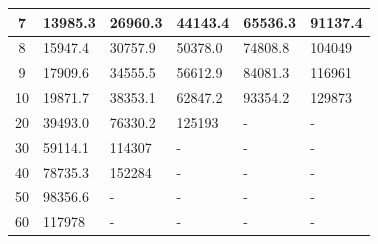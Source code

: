\begin{table}[H]
\begin{tabular}{|c|l|l|l|l|l|}
7                                                                          & 13985.3                              & 26960.3                               & 44143.4                               & 65536.3                               & 91137.4                               \\ \hline
8                                                                          & 15947.4                              & 30757.9                               & 50378.0                               & 74808.8                               & 104049                                \\ \hline
9                                                                          & 17909.6                              & 34555.5                               & 56612.9                               & 84081.3                               & 116961                                \\ \hline
10                                                                         & 19871.7                              & 38353.1                               & 62847.2                               & 93354.2                               & 129873                                \\ \hline
20                                                                         & 39493.0                              & 76330.2                               & 125193                                & -                                     & -                                     \\ \hline
30                                                                         & 59114.1                              & 114307                                & -                                     & -                                     & -                                     \\ \hline
40                                                                         & 78735.3                              & 152284                                & -                                     & -                                     & -                                     \\ \hline
50                                                                         & 98356.6                              & -                                     & -                                     & -                                     & -                                     \\ \hline
60                                                                         & 117978                               & -                                     & -                                     & -                                     & -                                     \\ \hline

\end{tabular}
\end{table}
